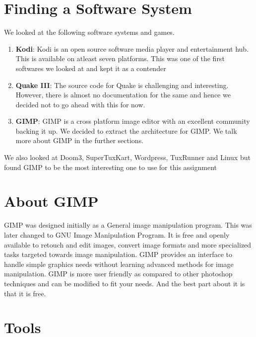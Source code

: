 \section{Finding a Software System}
We looked at the following software systems and games.
\begin{enumerate}
\item \textbf{Kodi}: Kodi is an open source software media player and entertainment hub. This is available on atleast seven platforms. This was one of the first softwares we looked at and kept it as a contender

\item \textbf{Quake III}: The source code for Quake is challenging and interesting. However, there is almost no documentation for the same and hence we decided not to go ahead with this for now.

\item \textbf{GIMP}: GIMP is a cross platform image editor with an excellent community backing it up. We decided to extract the architecture for GIMP. We talk more about GIMP in the further sections.

\end{enumerate}

We also looked at Doom3, SuperTuxKart, Wordpress, TuxRunner and Linux but found GIMP to be the most interesting one to use for this assignment
\section{About GIMP}
GIMP was designed initially as a General image manipulation program. This was later changed to GNU Image Manipulation Program. It is free and openly available to retouch and edit images, convert image formats and more specialized tasks targeted towards image manipulation. GIMP provides an interface to handle simple graphics needs without learning advanced methods for image manipulation. GIMP is more user friendly as compared to other photoshop techniques and can be modified to fit your needs. And the best part about it is that it is free.
\section{Tools}

